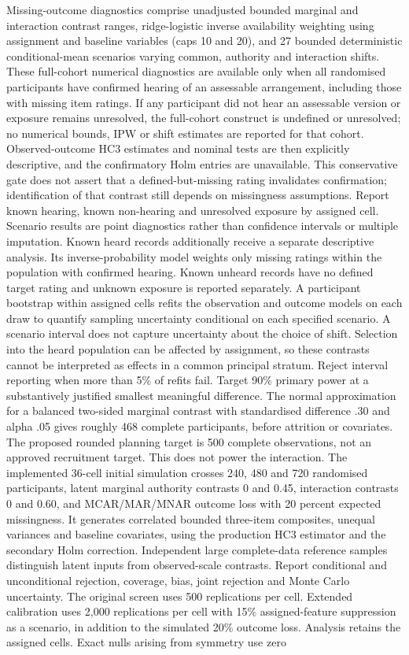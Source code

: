 \documentclass[11pt]{article}
\begin{document}
\par Missing-outcome diagnostics comprise unadjusted bounded marginal and interaction contrast ranges, ridge-logistic inverse availability weighting using assignment and baseline variables (caps 10 and 20), and 27 bounded deterministic conditional-mean scenarios varying common, authority and interaction shifts. These full-cohort numerical diagnostics are available only when all randomised participants have confirmed hearing of an assessable arrangement, including those with missing item ratings. If any participant did not hear an assessable version or exposure remains unresolved, the full-cohort construct is undefined or unresolved; no numerical bounds, IPW or shift estimates are reported for that cohort. Observed-outcome HC3 estimates and nominal tests are then explicitly descriptive, and the confirmatory Holm entries are unavailable. This conservative gate does not assert that a defined-but-missing rating invalidates confirmation; identification of that contrast still depends on missingness assumptions. Report known hearing, known non-hearing and unresolved exposure by assigned cell. Scenario results are point diagnostics rather than confidence intervals or multiple imputation. Known heard records additionally receive a separate descriptive analysis. Its inverse-probability model weights only missing ratings within the population with confirmed hearing. Known unheard records have no defined target rating and unknown exposure is reported separately. A participant bootstrap within assigned cells refits the observation and outcome models on each draw to quantify sampling uncertainty conditional on each specified scenario. A scenario interval does not capture uncertainty about the choice of shift. Selection into the heard population can be affected by assignment, so these contrasts cannot be interpreted as effects in a common principal stratum. Reject interval reporting when more than 5\% of refits fail. Target 90\% primary power at a substantively justified smallest meaningful difference. The normal approximation for a balanced two-sided marginal contrast with standardised difference .30 and alpha .05 gives roughly 468 complete participants, before attrition or covariates. The proposed rounded planning target is 500 complete observations, not an approved recruitment target. This does not power the interaction. The implemented 36-cell initial simulation crosses 240, 480 and 720 randomised participants, latent marginal authority contrasts 0 and 0.45, interaction contrasts 0 and 0.60, and MCAR/MAR/MNAR outcome loss with 20 percent expected missingness. It generates correlated bounded three-item composites, unequal variances and baseline covariates, using the production HC3 estimator and the secondary Holm correction. Independent large complete-data reference samples distinguish latent inputs from observed-scale contrasts. Report conditional and unconditional rejection, coverage, bias, joint rejection and Monte Carlo uncertainty. The original screen uses 500 replications per cell. Extended calibration uses 2,000 replications per cell with 15\% assigned-feature suppression as a scenario, in addition to the simulated 20\% outcome loss. Analysis retains the assigned cells. Exact nulls arising from symmetry use zero 
\end{document}
